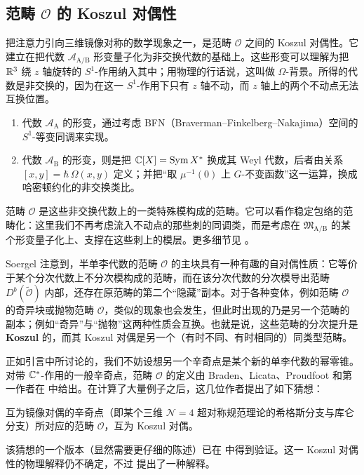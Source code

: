 \subsection{范畴 \texorpdfstring{$\mathcal{O}$}{O} 的 Koszul 对偶性}

把注意力引向三维镜像对称的数学现象之一，是范畴 $\mathcal{O}$ 之间的 Koszul 对偶性。它建立在把代数 $\mathcal{A}_{\operatorname{A/B}}$ 形变量子化为非交换代数的基础上。这些形变可以理解为把 $\mathbb{R}^3$ 绕 $z$ 轴旋转的 $S^1$-作用纳入其中；用物理的行话说，这叫做 $\Omega$-背景。所得的代数是非交换的，因为在这一 $S^1$-作用下只有 $z$ 轴不动，而 $z$ 轴上的两个不动点无法互换位置。
\begin{enumerate}
    \item 代数 $\mathcal{A}_{\operatorname{A}}$ 的形变，通过考虑 BFN（Braverman–Finkelberg–Nakajima）空间的 $S^1$-等变同调来实现。
    \item 代数 $\mathcal{A}_{\operatorname{B}}$ 的形变，则是把 $\mathbb{C}[X]=\operatorname{Sym} X^*$ 换成其 Weyl 代数，后者由关系 $[x,y]=\hbar\,\Omega(x,y)$ 定义；并把“取 $\mu^{-1}(0)$ 上 $G$-不变函数”这一运算，换成哈密顿约化的非交换类比。
\end{enumerate}
范畴 $\mathcal{O}$ 是这些非交换代数上的一类特殊模构成的范畴。它可以看作稳定包络的范畴化：这里我们不再考虑流入不动点的那些刺的同调类，而是考虑在 $\mathfrak{M}_{\operatorname{A/B}}$ 的某个形变量子化上、支撑在这些刺上的模层。更多细节见 \cite[\S 3]{BLPWgco}。

Soergel 注意到，半单李代数的范畴 $\mathcal{O}$ 的主块具有一种有趣的自对偶性质：它等价于某个分次代数上不分次模构成的范畴，而在该分次代数的分次模导出范畴 $D^b(\tilde{\mathcal{O}})$ 内部，还存在原范畴的第二个“隐藏”副本。对于各种变体，例如范畴 $\mathcal{O}$ 的奇异块或抛物范畴 $\mathcal{O}$，类似的现象也会发生，但此时出现的乃是另一个范畴的副本；例如“奇异”与“抛物”这两种性质会互换。也就是说，这些范畴的分次提升是{\bf Koszul} 的，而其 Koszul 对偶是另一个（有时不同、有时相同的）同类型范畴。

正如引言中所讨论的，我们不妨设想另一个辛奇点是某个新的单李代数的幂零锥。对带 $\mathbb{C}^*$-作用的一般辛奇点，范畴 $\mathcal{O}$ 的定义由 Braden、Licata、Proudfoot 和第一作者在 \cite{BLPWgco} 中给出。在计算了大量例子之后，这几位作者提出了如下猜想：
\begin{conjecture}
互为镜像对偶的辛奇点（即某个三维 $\mathcal{N}=4$ 超对称规范理论的希格斯分支与库仑分支）所对应的范畴 $\mathcal{O}$，互为 Koszul 对偶。
\end{conjecture}
该猜想的一个版本（显然需要更仔细的陈述）已在 \cite{websterKoszulDuality2019} 中得到验证。这一 Koszul 对偶性的物理解释仍不确定，不过 \cite[\S 7.5]{bullimoreBoundariesMirror2016} 提出了一种解释。

